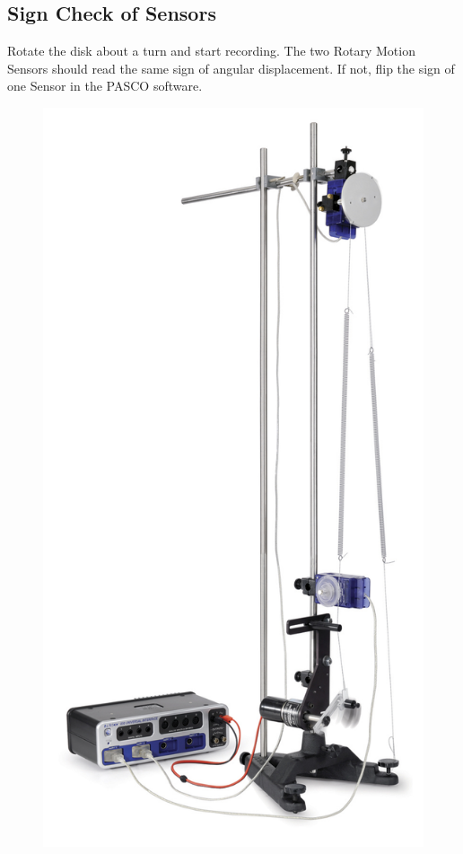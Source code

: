 \subsection{Sign Check of Sensors}
Rotate the disk about a turn and start recording. The two Rotary Motion Sensors should read the same sign of angular displacement. If not, flip the sign of one Sensor in the PASCO software.
\begin{figure}[h]
	\begin{minipage}[c]{0.4\linewidth}
		\includegraphics[width=\linewidth]{set}

\end{minipage}
\end{figure}

